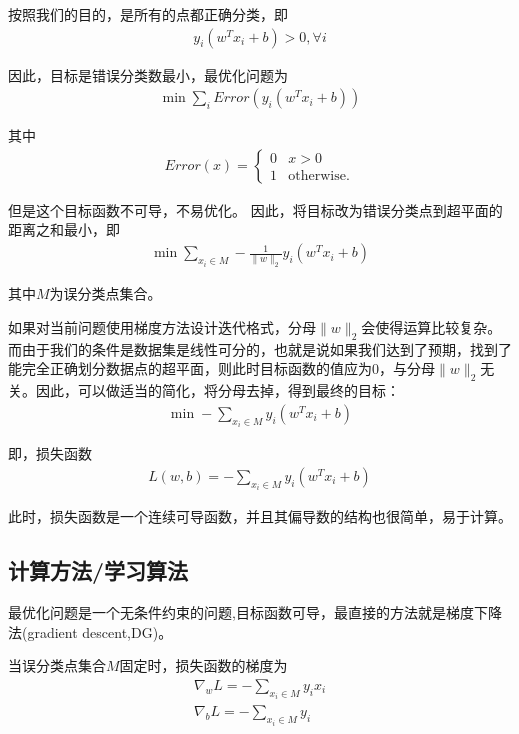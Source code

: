 \documentclass[a4paper,8pt]{article}
\begin{document}
按照我们的目的，是所有的点都正确分类，即
\begin{eqnarray}
y_i (w^T x_i +b) > 0 ,\forall i
\end{eqnarray}

因此，目标是错误分类数最小，最优化问题为
\begin{eqnarray}
\min \sum_i Error\left(y_i (w^T x_i +b)\right)
\end{eqnarray}

其中
\begin{eqnarray}
Error(x) =  
\begin{cases}
0 & x>0\\
1 & \text{otherwise}.
\end{cases}
\end{eqnarray}

但是这个目标函数不可导，不易优化。
因此，将目标改为错误分类点到超平面的距离之和最小，即
\begin{eqnarray}
\min \sum_{x_i \in M} -\frac{1}{\| w \|_2} y_i ( w^T x_i + b)
\end{eqnarray}

其中$M$为误分类点集合。

如果对当前问题使用梯度方法设计迭代格式，分母$\|w\|_2$会使得运算比较复杂。而由于我们的条件是数据集是线性可分的，也就是说如果我们达到了预期，找到了能完全正确划分数据点的超平面，则此时目标函数的值应为0，与分母$\|w\|_2$无关。因此，可以做适当的简化，将分母去掉，得到最终的目标：
\begin{eqnarray}
\min -\sum_{x_i \in M} y_i ( w^T x_i + b)
\end{eqnarray}

即，损失函数
\begin{eqnarray}
L(w,b) = -\sum_{x_i \in M} y_i ( w^T x_i + b)
\end{eqnarray}

此时，损失函数是一个连续可导函数，并且其偏导数的结构也很简单，易于计算。

\subsection{计算方法/学习算法}

最优化问题是一个无条件约束的问题,目标函数可导，最直接的方法就是梯度下降法(gradient descent,DG)。

当误分类点集合$M$固定时，损失函数的梯度为
\begin{eqnarray}
\nabla_w L = -\sum_{x_i\in M} y_i x_i  \\
\nabla_b L = -\sum_{x_i\in M} y_i
\end{eqnarray}
\end{document}
